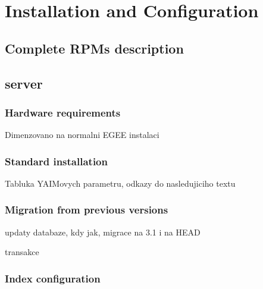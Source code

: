 \section{Installation and Configuration}
\TODO{}

\subsection{Complete RPMs description}

\subsection{\LB server}

\subsubsection{Hardware requirements}

Dimenzovano na normalni EGEE instalaci

\subsubsection{Standard installation}


Tabluka YAIMovych parametru, odkazy do nasledujiciho textu

\subsubsection{Migration from previous versions}


updaty databaze, kdy jak, migrace na 3.1 i na HEAD

transakce


\subsubsection{Index configuration}


